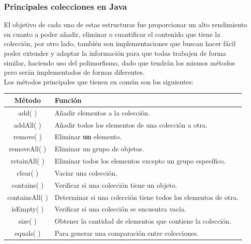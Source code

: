 \documentclass[12pt]{report}
\begin{document}
\subsubsection{Principales colecciones en Java}
El objetivo de cada uno de estas estructuras fue proporcionar un alto rendimiento en cuanto a poder añadir, eliminar o cuantificar el contenido que tiene la colección, por otro lado, también son implementaciones que buscan hacer fácil poder extender y adaptar la información para que todas trabajen de forma similar, haciendo uso del polimorfismo, dado que tendrán los mismos métodos pero serán implementados de formas diferentes. \cite{Vindel} \\ Los métodos principales que tienen en común son los siguientes:\\

\begin{center}
    \begin{tabular}{|c|p{9cm}|}
        \hline
        Método& Función\\
        \hline\hline
        add( ) & Añadir elementos a la colección.\\
        \hline
        addAll( ) & Añadir todos los elementos de una colección a    otra.\\
        \hline
        remove( ) & Eliminar \textbf{un} elemento.\\
        \hline
        removeAll( ) & Eliminar un grupo de objetos.\\
        \hline
        retainAll( ) & Eliminar todos los elementos excepto un grupo específico.\\
        \hline
        clear( ) & Vaciar una colección.\\
        \hline
        contains( ) & Verificar si una colección tiene un objeto.\\
        \hline
        containsAll( ) & Determinar si una colección tiene todos los elementos de otra.\\
        \hline
        isEmpty( ) & Verificar si una colección se encuentra vacía.\\
        \hline
        size( ) & Obtener la cantidad de elementos que contiene la colección.\\
        \hline
        equals( ) & Para generar una comparación entre colecciones.\\
        \hline
    \end{tabular}    
\end{center}
\end{document}
